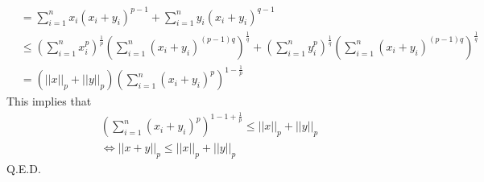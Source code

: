 \begin{enumerate}
\begin{enumerate}
\begin{align*}
		&=\sum_{i=1}^nx_i(x_i+y_i)^{p-1} + \sum_{i=1}^n y_i(x_i+y_i)^{q-1}\\
		&\le (\sum_{i=1}^nx_i^p)^{\frac{1}{p}}(\sum_{i=1}^n(x_i+y_i)^{(p-1)q})^\frac{1}{q} + (\sum_{i=1}^ny_i^p)^{\frac{1}{q}}(\sum_{i=1}^n(x_i+y_i)^{(p-1)q})^\frac{1}{q}\\
		&=(||x||_p+||y||_p)(\sum_{i=1}^n(x_i+y_i)^p)^{1-\frac{1}{p}}
		\end{align*}
		This implies that
		\begin{align*}
		(\sum_{i=1}^n(x_i+y_i)^p)^{1-1+\frac{1}{p}} \le||x||_p+||y||_p\\
		\Leftrightarrow ||x+y||_p\le||x||_p+||y||_p
		\end{align*}
		Q.E.D.
	\end{enumerate}
\end{enumerate}